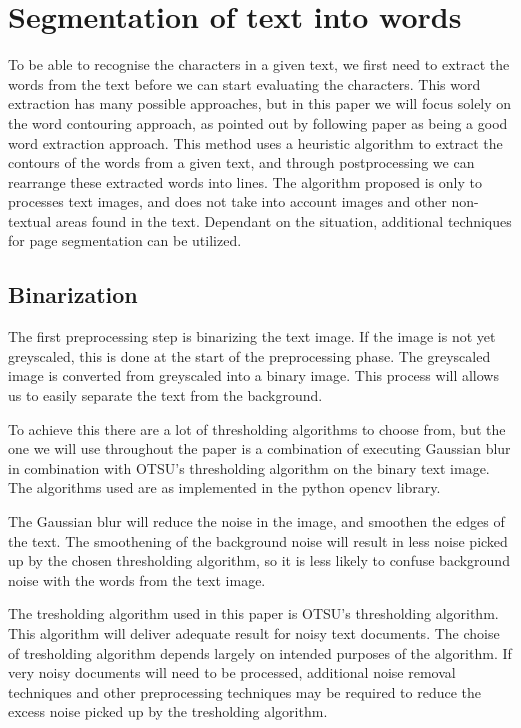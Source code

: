\documentclass{article}
\begin{document}
\section{Segmentation of text into words}
\label{sec:segtext}

To be able to recognise the characters in a given text, we first need to extract the words from the text before we can start evaluating the characters. This word extraction has many possible approaches, but in this paper we will focus solely on the word contouring approach, as pointed out by following paper \cite{WordSegm} as being a good word extraction approach.
This method uses a heuristic algorithm to extract the contours of the words from a given text, and through postprocessing we can rearrange these extracted words into lines.
The algorithm proposed is only to processes text images, and does not take into account images and other non-textual areas found in the text.
Dependant on the situation, additional techniques for page segmentation can be utilized. %


\subsection{Binarization}
The first preprocessing step is binarizing the text image.
If the image is not yet greyscaled, this is done at the start of the preprocessing phase.
The greyscaled image is converted from greyscaled into a binary image.
This process will allows us to easily separate the text from the background.

To achieve this there are a lot of thresholding algorithms to choose from, but the one we will use throughout the paper is a combination of executing Gaussian blur in combination with OTSU's thresholding algorithm on the binary text image.
The algorithms used are as implemented in the python opencv library. %

The Gaussian blur will reduce the noise in the image, and smoothen the edges of the text.
The smoothening of the background noise will result in less noise picked up by the chosen thresholding algorithm, so it is less likely to confuse background noise with the words from the text image.

The tresholding algorithm used in this paper is OTSU's thresholding algorithm.
This algorithm will deliver adequate result for noisy text documents.
The choise of tresholding algorithm depends largely on intended purposes of the algorithm.
If very noisy documents will need to be processed, additional noise removal techniques and other preprocessing techniques may be required to reduce the excess noise picked up by the tresholding algorithm.
\end{document}
